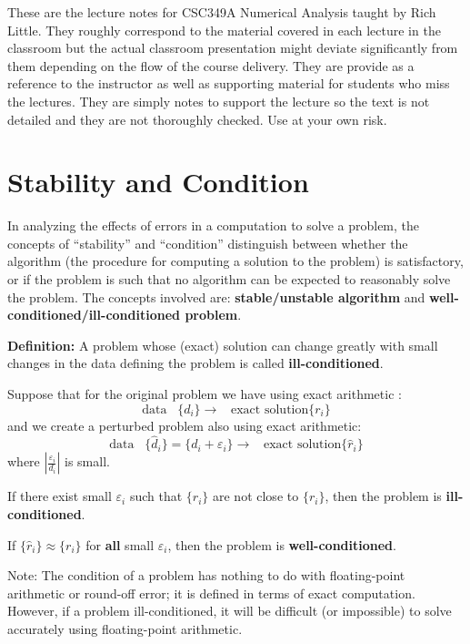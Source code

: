 \documentclass [titlepage,12pt,letter] {article}
\begin{document}
 


These are the lecture notes for CSC349A Numerical Analysis taught by
Rich Little. They roughly correspond to
the material covered in each lecture in the classroom but the actual
classroom presentation might deviate significantly from them depending
on the flow of the course delivery. They are provide as a reference to
the instructor as well as supporting material for students who miss
the lectures. They are simply notes to support the lecture so the text
is not detailed and they are not thoroughly checked. Use at your own
risk. 


\section{Stability and Condition} 

In analyzing the effects of errors in a computation to solve
a problem, the concepts of ``stability'' and ``condition'' distinguish
between whether the algorithm (the procedure for computing a solution
to the problem) is satisfactory, or if the problem is such that no
algorithm can be expected to reasonably solve the problem. The
concepts involved are: {\bf stable/unstable algorithm} and {\bf
  well-conditioned/ill-conditioned problem}.

\medskip 
\noindent 
{\bf Definition:} A problem whose (exact) solution can change greatly with small changes in the data defining the problem is called {\bf ill-conditioned}. 

\medskip 
\noindent 
Suppose that for the original problem we have using exact arithmetic : 
\[
\mbox{data} \;\;\; \{d_i\} \rightarrow  \;\;\; \mbox{exact solution} \{r_i\}
\] 
and we create a perturbed problem also using exact arithmetic: 
\[ 
\mbox{data} \;\;\; \{\hat d_i\}=\{d_i+\varepsilon_i\} \rightarrow \;\;\; \mbox{exact solution} \{\hat r_i\}
\]
\noindent 
where $|\frac{\varepsilon_i}{d_i}|$ is small. 

If there exist small $\varepsilon_i$ such that $\{ \hat r_i \}$ are not close to 
$\{ r_i \}$, then the problem is {\bf ill-conditioned}.  

If $\{\hat r_i\} \approx \{ r_i \}$ for {\bf all} small $\varepsilon_i$, then the problem is {\bf well-conditioned}. 

\noindent 
Note: The condition of a problem has nothing to do with floating-point arithmetic or round-off error; it is defined in terms of exact computation. However, if a problem ill-conditioned, it will be difficult (or impossible) to solve accurately using floating-point arithmetic. 
\end{document}
